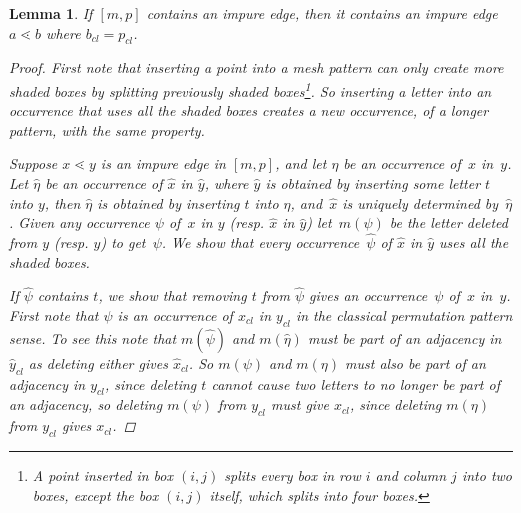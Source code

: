 \documentclass[preprint,11pt]{elsarticle}
\newtheorem{lem}[thm]{Lemma}\crefname{lem}{Lemma}{Lemmas}
\newcommand\cl[1]{#1_{cl}}
\numberwithin{equation}{section}
\numberwithin{figure}{section}
\numberwithin{thm}{section}
\begin{document}
\begin{lem}\label{lem:topImpure}
If $[m,p]$ contains an impure edge, then it contains an impure edge
$a\lessdot b$ where $\cl{b}=\cl{p}$.
\begin{proof}
First note that inserting a point into a mesh pattern can only create more shaded boxes by splitting previously 
 shaded boxes\footnote{A point inserted in box $(i,j)$ splits
 every box in row $i$ and column $j$ into two boxes, except the box $(i,j)$ itself,
 which splits into four boxes.}. So inserting a letter into
 an occurrence that uses all the shaded boxes
 creates a new occurrence, of a longer pattern, with the same property.

Suppose $x\lessdot y$ is an impure edge in $[m,p]$, and let $\eta$ be an occurrence of~$x$ in~$y$.
 Let $\hat{\eta}$ be an occurrence of $\hat{x}$ in $\hat{y}$,
 where $\hat{y}$ is obtained by inserting some letter $t$ into $y$, then $\hat{\eta}$ is obtained by inserting 
 $t$ into $\eta$, and~$\hat{x}$ is uniquely determined by~$\hat{\eta}$.
 Given any occurrence $\psi$ of~$x$ in $y$ (resp. $\hat{x}$ in $\hat{y}$) let~$m(\psi)$ be the letter deleted from $y$ (resp. $\hat{y}$) to get~$\psi$.
 We show that every occurrence~$\hat{\psi}$ of $\hat{x}$ in $\hat{y}$ uses all the shaded boxes.

If $\hat{\psi}$ contains $t$, we show that removing $t$ 
 from $\hat{\psi}$ gives an occurrence~$\psi$ of~$x$ in~$y$.   
 First note that $\psi$ is an occurrence of $\cl{x}$ in $\cl{y}$ in the classical permutation pattern sense.
 To see this note that $m(\hat{\psi})$ and $m(\hat{\eta})$ must be part of an adjacency in $\cl{\hat{y}}$ as deleting either gives $\cl{\hat{x}}$.
 So $m(\psi)$ and $m(\eta)$ must also be part of an adjacency in $\cl{y}$, since deleting $t$ cannot cause two letters to no longer
 be part of an adjacency, so deleting $m(\psi)$ from $\cl{y}$ must give $\cl{x}$, since deleting $m(\eta)$ from $\cl{y}$ gives $\cl{x}$.
 

\end{proof}
\end{lem}
\end{document}
